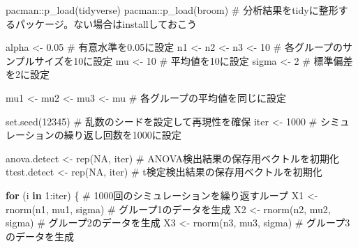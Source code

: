 \documentclass[
  a4paper,
]{ltjsbook}
\newenvironment{Shaded}{\begin{snugshade}}{\end{snugshade}}
\newcommand{\CommentTok}[1]{\textcolor[rgb]{0.37,0.37,0.37}{#1}}
\newcommand{\ConstantTok}[1]{\textcolor[rgb]{0.56,0.35,0.01}{#1}}
\newcommand{\ControlFlowTok}[1]{\textcolor[rgb]{0.00,0.23,0.31}{\textbf{#1}}}
\newcommand{\DecValTok}[1]{\textcolor[rgb]{0.68,0.00,0.00}{#1}}
\newcommand{\FloatTok}[1]{\textcolor[rgb]{0.68,0.00,0.00}{#1}}
\newcommand{\FunctionTok}[1]{\textcolor[rgb]{0.28,0.35,0.67}{#1}}
\newcommand{\NormalTok}[1]{\textcolor[rgb]{0.00,0.23,0.31}{#1}}
\newcommand{\OtherTok}[1]{\textcolor[rgb]{0.00,0.23,0.31}{#1}}
\newcommand{\SpecialCharTok}[1]{\textcolor[rgb]{0.37,0.37,0.37}{#1}}
\begin{document}
\begin{Shaded}
\begin{Highlighting}[]
\NormalTok{pacman}\SpecialCharTok{::}\FunctionTok{p\_load}\NormalTok{(tidyverse)}
\NormalTok{pacman}\SpecialCharTok{::}\FunctionTok{p\_load}\NormalTok{(broom) }\CommentTok{\# 分析結果をtidyに整形するパッケージ。ない場合はinstallしておこう}
\end{Highlighting}
\end{Shaded}

\begin{Shaded}
\begin{Highlighting}[]
\NormalTok{alpha }\OtherTok{\textless{}{-}} \FloatTok{0.05} \CommentTok{\# 有意水準を0.05に設定}
\NormalTok{n1 }\OtherTok{\textless{}{-}}\NormalTok{ n2 }\OtherTok{\textless{}{-}}\NormalTok{ n3 }\OtherTok{\textless{}{-}} \DecValTok{10} \CommentTok{\# 各グループのサンプルサイズを10に設定}
\NormalTok{mu }\OtherTok{\textless{}{-}} \DecValTok{10} \CommentTok{\# 平均値を10に設定}
\NormalTok{sigma }\OtherTok{\textless{}{-}} \DecValTok{2} \CommentTok{\# 標準偏差を2に設定}

\NormalTok{mu1 }\OtherTok{\textless{}{-}}\NormalTok{ mu2 }\OtherTok{\textless{}{-}}\NormalTok{ mu3 }\OtherTok{\textless{}{-}}\NormalTok{ mu }\CommentTok{\# 各グループの平均値を同じに設定}

\FunctionTok{set.seed}\NormalTok{(}\DecValTok{12345}\NormalTok{) }\CommentTok{\# 乱数のシードを設定して再現性を確保}
\NormalTok{iter }\OtherTok{\textless{}{-}} \DecValTok{1000} \CommentTok{\# シミュレーションの繰り返し回数を1000に設定}

\NormalTok{anova.detect }\OtherTok{\textless{}{-}} \FunctionTok{rep}\NormalTok{(}\ConstantTok{NA}\NormalTok{, iter) }\CommentTok{\# ANOVA検出結果の保存用ベクトルを初期化}
\NormalTok{ttest.detect }\OtherTok{\textless{}{-}} \FunctionTok{rep}\NormalTok{(}\ConstantTok{NA}\NormalTok{, iter) }\CommentTok{\# t検定検出結果の保存用ベクトルを初期化}

\ControlFlowTok{for}\NormalTok{ (i }\ControlFlowTok{in} \DecValTok{1}\SpecialCharTok{:}\NormalTok{iter) \{ }\CommentTok{\# 1000回のシミュレーションを繰り返すループ}
\NormalTok{  X1 }\OtherTok{\textless{}{-}} \FunctionTok{rnorm}\NormalTok{(n1, mu1, sigma) }\CommentTok{\# グループ1のデータを生成}
\NormalTok{  X2 }\OtherTok{\textless{}{-}} \FunctionTok{rnorm}\NormalTok{(n2, mu2, sigma) }\CommentTok{\# グループ2のデータを生成}
\NormalTok{  X3 }\OtherTok{\textless{}{-}} \FunctionTok{rnorm}\NormalTok{(n3, mu3, sigma) }\CommentTok{\# グループ3のデータを生成}


\end{Highlighting}
\end{Shaded}
\end{document}
